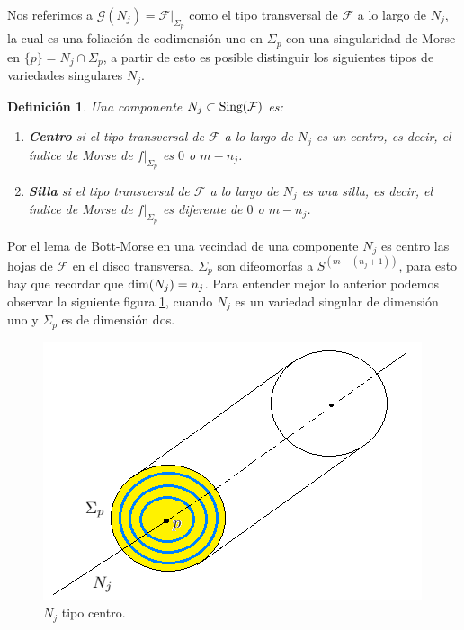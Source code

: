\documentclass[a4paper,10pt]{book}
\newtheorem{definicion}{Definici\'on}[chapter]
\begin{document}
Nos referimos a $\mathcal{G}(N_{j})=\mathcal{F}|_{\Sigma_{p}}$ como el tipo transversal de $\mathcal{F}$ a lo largo de $N_{j}$, la cual es una foliaci\'on de codimensi\'on uno en $\Sigma_{p}$ con una singularidad de Morse en $\{p\}=N_{j}\cap\Sigma_{p}$, a partir de esto es posible distinguir los siguientes tipos de variedades singulares $N_{j}$.

\begin{definicion}
Una componente $N_{j}\subset {\rm Sing(\mathcal{F})}$ es:
    \begin{enumerate}
        \item {\bfseries Centro} si el tipo transversal de $\mathcal{F}$ a lo largo de $N_{j}$ es un centro, es decir, el \'indice de Morse de $f|_{\Sigma_{p}}$ es $0$ o $m-n_{j}$.
        \item {\bfseries Silla} si el tipo transversal de $\mathcal{F}$ a lo largo de $N_{j}$ es una silla, es decir, el \'indice de Morse de $f|_{\Sigma_{p}}$ es diferente de  $0$ o $m-n_{j}$.
    \end{enumerate}
\end{definicion}

Por el lema de Bott-Morse en una vecindad de una componente $N_{j}$ es centro las hojas de $\mathcal{F}$ en el disco transversal $\Sigma_{p}$ son difeomorfas a $S^{(m-(n_{j}+1))}$, para esto hay que recordar que ${\rm dim}(N_{j})=n_{j}$. Para entender mejor lo anterior podemos observar la siguiente figura \ref{centro}, cuando $N_{j}$ es un variedad singular de dimensi\'on uno y $\Sigma_{p}$ es de dimensi\'on dos.

\begin{figure}[!ht]
\centering
\includegraphics[scale=0.6]{centro.png}
\caption{$N_{j}$ tipo centro.}
\label{centro}
\end{figure}
\end{document}
